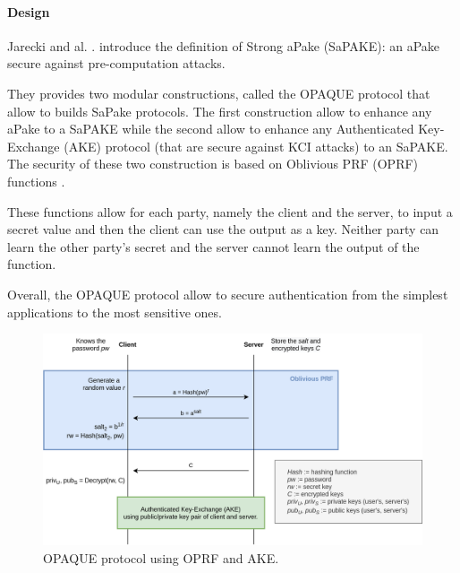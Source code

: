 \documentclass[../report.tex]{subfiles}
\begin{document}




\paragraph{Design}
Jarecki and al. \cite{}. introduce the definition of Strong aPake (SaPAKE): an aPake secure against pre-computation attacks.

They provides two modular constructions, called the OPAQUE protocol that allow to builds SaPake protocols. The first construction allow to enhance any aPake to a SaPAKE while the second allow to enhance any Authenticated Key-Exchange (AKE) protocol (that are secure against KCI attacks) to an SaPAKE.
The security of these two construction is based on Oblivious PRF (OPRF) functions \cite{}.

These functions allow for each party, namely the client and the server, to input a secret value and then the client can use the output as a key. Neither party can learn the other party's secret and the server cannot learn the output of the function.

Overall, the OPAQUE protocol allow to secure authentication from the simplest applications to the most sensitive ones.


\begin{figure}[h]
 \centering
 \includegraphics[width=\textwidth]{OPAQUE.png}
 \caption{OPAQUE protocol using OPRF and AKE.}
 \label{fig:OPAQUE_AKE}
\end{figure}
\end{document}
